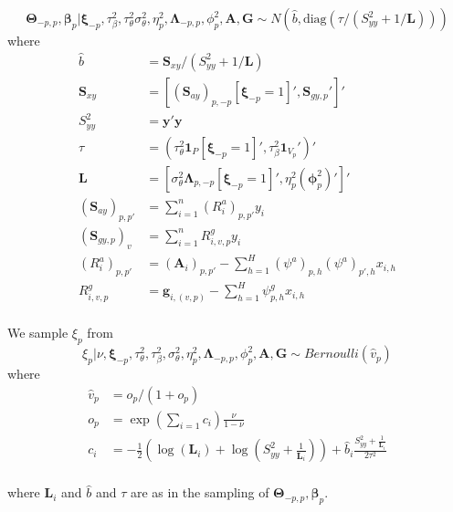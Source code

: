\documentclass[
]{article}
\begin{document}
\[  {\boldsymbol \Theta} _{-p,p},  {\boldsymbol \beta} _p | {\boldsymbol \xi} _{-p}, \tau_\beta^2, \tau_\theta^2 \sigma_{\theta}^2, \eta_p^2,  {\boldsymbol \Lambda} _{-p,p}, \phi_p^2,  {\boldsymbol A} , {\boldsymbol G} \sim N(\hat{b}, \text{diag}(\tau/(S_{yy}^2 + 1 /  {\boldsymbol L} ) ) )\]
where
\begin{align*}
    \hat{b}           &=  {\boldsymbol S} _{xy} / (S_{yy}^2 + 1 /  {\boldsymbol L} ) \\
     {\boldsymbol S} _{xy}          &= [ ( {\boldsymbol S} _{ay})_{p, -p}[ {\boldsymbol \xi} _{-p} = 1]',  {\boldsymbol S} _{gy,p}']' \\
    S_{yy}^2          &=  {\boldsymbol y} ' {\boldsymbol y} \\
    \tau              &= (\tau_\theta^2  {\boldsymbol 1} _P[ {\boldsymbol \xi} _{-p} = 1]', \tau_\beta^2  {\boldsymbol 1} _{V_p}')' \\ 
     {\boldsymbol L} &= [\sigma^2_{\theta}  {\boldsymbol \Lambda} _{p, -p}[ {\boldsymbol \xi} _{-p} = 1]',\eta_p^2 ( {\boldsymbol \phi} _p^2)']' \\
    ( {\boldsymbol S} _{ay})_{p,p'} &= \sum_{i=1}^n (R_i^a)_{p,p'}y_i \\
    ( {\boldsymbol S} _{gy,p})_{v}  &= \sum_{i=1}^n R_{i,v,p}^g y_i \\
    (R_i^a)_{p,p'}    &= ( {\boldsymbol A} _i)_{p,p'} - \sum_{h=1}^H (\psi^a)_{p,h} (\psi^a)_{p',h} x_{i,h} \\
    R_{i,v,p}^g       &=  {\boldsymbol g} _{i,(v,p)} - \sum_{h=1}^H \psi^g_{p,h} x_{i,h} \\
\end{align*}

We sample \(\xi_p\) from
\[ \xi_p|\nu,  {\boldsymbol \xi} _{-p}, \tau_\theta^2, \tau_\beta^2, \sigma_{\theta}^2, \eta_p^2,  {\boldsymbol \Lambda} _{-p,p}, \phi_p^2,  {\boldsymbol A} , {\boldsymbol G} \sim Bernoulli(\hat{v}_p)\]
where
\begin{align*}
    \hat{v}_p &= o_p / (1 + o_p) \\
    o_p       &= \exp(\sum_{i=1} c_i) \frac{\nu}{1-\nu}\\
    c_i       &= -\frac{1}{2} \left(\log( {\boldsymbol L} _i) + \log\left(S_{yy}^2 +\frac{1}{ {\boldsymbol L} _i}\right) \right) + \hat{b}_i \frac{S_{yy}^2 +\frac{1}{ {\boldsymbol L} _i}}{2\tau^2}\\
\end{align*}

where \( {\boldsymbol L} _i\) and \(\hat{b}\) and \(\tau\) are as in the sampling of \( {\boldsymbol \Theta} _{-p,p},  {\boldsymbol \beta} _p\).
\end{document}
